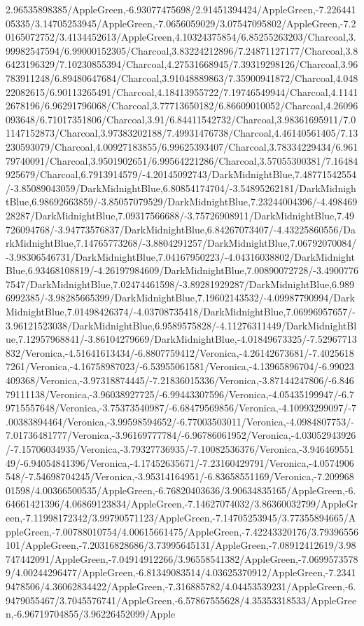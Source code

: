{\begin{tikzternal}
2.96535898385/AppleGreen,-6.93077475698/2.91451394424/AppleGreen,-7.22644105335/3.14705253945/AppleGreen,-7.0656059029/3.07547095802/AppleGreen,-7.20165072752/3.4134452613/AppleGreen,4.10324375854/6.85255263203/Charcoal,3.99982547594/6.99000152305/Charcoal,3.83224212896/7.24871127177/Charcoal,3.86423196329/7.10230855394/Charcoal,4.27531668945/7.39319298126/Charcoal,3.96783911248/6.89480647684/Charcoal,3.91048889863/7.35900941872/Charcoal,4.04822082615/6.90113265491/Charcoal,4.18413955722/7.19746549944/Charcoal,4.11412678196/6.96291796068/Charcoal,3.77713650182/6.86609010052/Charcoal,4.26096093648/6.71017351806/Charcoal,3.91/6.84411542732/Charcoal,3.98361695911/7.01147152873/Charcoal,3.97383202188/7.49931476738/Charcoal,4.46140561405/7.13230593079/Charcoal,4.00927183855/6.99625393407/Charcoal,3.78334229434/6.96179740091/Charcoal,3.9501902651/6.99564221286/Charcoal,3.57055300381/7.16484925679/Charcoal,6.7913914579/-4.20145092743/DarkMidnightBlue,7.48771542554/-3.85089043059/DarkMidnightBlue,6.80854174704/-3.54895262181/DarkMidnightBlue,6.98692663859/-3.85057079529/DarkMidnightBlue,7.23244004396/-4.49846928287/DarkMidnightBlue,7.09317566688/-3.75726908911/DarkMidnightBlue,7.49726094768/-3.94773576837/DarkMidnightBlue,6.84267073407/-4.43225860556/DarkMidnightBlue,7.14765773268/-3.8804291257/DarkMidnightBlue,7.06792070084/-3.98306546731/DarkMidnightBlue,7.04167950223/-4.04316038802/DarkMidnightBlue,6.93468108819/-4.26197984609/DarkMidnightBlue,7.00890072728/-3.49007767547/DarkMidnightBlue,7.02474461598/-3.89281929287/DarkMidnightBlue,6.9896992385/-3.98285665399/DarkMidnightBlue,7.19602143532/-4.09987790994/DarkMidnightBlue,7.01498426374/-4.03708735418/DarkMidnightBlue,7.06996957657/-3.96121523038/DarkMidnightBlue,6.9589575828/-4.11276311449/DarkMidnightBlue,7.12957968841/-3.86104279669/DarkMidnightBlue,-4.01849673325/-7.52967713832/Veronica,-4.51641613434/-6.8807759412/Veronica,-4.26142673681/-7.40256187261/Veronica,-4.16758987023/-6.53955061581/Veronica,-4.13965896704/-6.99023409368/Veronica,-3.97318874445/-7.21836015336/Veronica,-3.87144247806/-6.84679111138/Veronica,-3.96038927725/-6.99443307596/Veronica,-4.05435199947/-6.79715557648/Veronica,-3.75373540987/-6.68479569856/Veronica,-4.10993299097/-7.00383894464/Veronica,-3.99598594652/-6.77003503011/Veronica,-4.0984807753/-7.01736481777/Veronica,-3.96169777784/-6.96786061952/Veronica,-4.03052943926/-7.15706034935/Veronica,-3.79327736935/-7.10082536376/Veronica,-3.94646955149/-6.94054841396/Veronica,-4.17452635671/-7.23160429791/Veronica,-4.0574906548/-7.54698704245/Veronica,-3.95314164951/-6.83658551169/Veronica,-7.20996801598/4.00366500535/AppleGreen,-6.76820403636/3.90634835165/AppleGreen,-6.64661421396/4.06869123834/AppleGreen,-7.14627074032/3.86360032799/AppleGreen,-7.11998172342/3.99790571123/AppleGreen,-7.14705253945/3.77355894665/AppleGreen,-7.00788010754/4.00615661475/AppleGreen,-7.42243320176/3.79396556101/AppleGreen,-7.20316828686/3.73995645131/AppleGreen,-7.08912412619/3.98747442091/AppleGreen,-7.04914912266/3.96558541382/AppleGreen,-7.06995735789/4.00244296477/AppleGreen,-6.81349083514/4.03625370912/AppleGreen,-7.23419478506/4.36062834422/AppleGreen,-7.316885782/4.04453539231/AppleGreen,-6.9479055467/3.7045576741/AppleGreen,-6.57867555628/4.35353318533/AppleGreen,-6.96719704855/3.96226452099/Apple
\end{tikzternal}}
